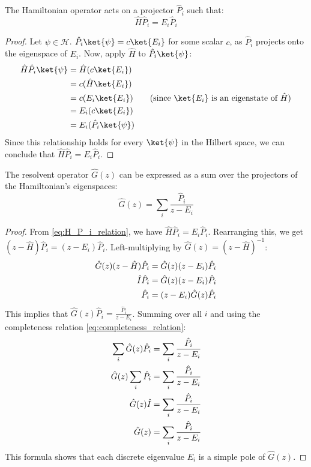 \begin{lemma}
  The Hamiltonian operator acts on a projector $\hat P_i$ such that:
  \begin{equation} \label{eq:H_P_i_relation}
    \hat H \hat P_i = E_i \hat P_i
  \end{equation}
\end{lemma}
\begin{proof}
  Let $\psi \in \mathcal{H}$. $\hat P_i \ket{\psi} = c \ket{E_i}$
  for some scalar $c$, as
  $\hat P_i$ projects onto the eigenspace of $E_i$.
  Now, apply $\hat H$ to $\hat P_i \ket{\psi}$:
  \begin{align} \label{eq:H_P_i_proof}
    \hat H \hat P_i \ket{\psi} &= \hat H (c \ket{E_i}) \\
    &= c (\hat H \ket{E_i}) \notag \\
    &= c (E_i \ket{E_i}) \quad &\text{(since } \ket{E_i} \text{
    is an eigenstate of } \hat H \text{)} \notag \\
    &= E_i (c \ket{E_i}) \notag \\
    &= E_i (\hat P_i \ket{\psi}) \notag
  \end{align}
  Since this relationship holds for every $\ket{\psi}$ in the
  Hilbert space, we can conclude that $\hat H \hat P_i = E_i \hat P_i$.
\end{proof}

\begin{proposition}
  The resolvent operator $\hat G(z)$ can be expressed as a sum over
  the projectors of the Hamiltonian's eigenspaces:
  \begin{equation} \label{eq:resolvent_spectral_decomposition}
    \hat G(z) = \sum_i \frac{\hat P_i}{z - E_i}
  \end{equation}
\end{proposition}
\begin{proof}
  From \eqref{eq:H_P_i_relation}, we have $\hat H \hat P_i = E_i \hat P_i$.
  Rearranging this, we get $(z - \hat H) \hat P_i = (z - E_i) \hat P_i$.
  Left-multiplying by $\hat G(z) = (z - \hat H)^{-1}$:
  \begin{align} \label{eq:resolvent_derivation}
    \hat G(z) (z - \hat H) \hat P_i &= \hat G(z) (z - E_i) \hat P_i \\
    \hat I \hat P_i &= \hat G(z) (z - E_i) \hat P_i \notag \\
    \hat P_i &= (z - E_i) \hat G(z) \hat P_i \notag
  \end{align}
  This implies that $\hat G(z) \hat P_i = \frac{\hat P_i}{z - E_i}$.
  Summing over all $i$ and using the completeness relation
  \eqref{eq:completeness_relation}:
  \begin{align}
    \sum_i \hat G(z) \hat P_i &= \sum_i \frac{\hat P_i}{z - E_i} \\
    \hat G(z) \sum_i \hat P_i &= \sum_i \frac{\hat P_i}{z - E_i} \notag \\
    \hat G(z) \hat I &= \sum_i \frac{\hat P_i}{z - E_i} \notag \\
    \hat G(z) &= \sum_i \frac{\hat P_i}{z - E_i} \notag
  \end{align}
  This formula shows that each discrete eigenvalue $E_i$ is a
  simple pole of $\hat G(z)$.
\end{proof}

